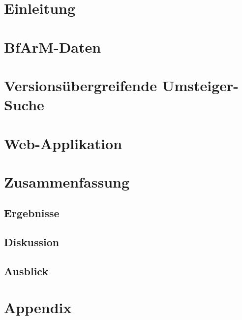 \documentclass[german,version-2020-11]{uzl-thesis}
\begin{document}
%

\chapter{Einleitung} 

\chapter{BfArM-Daten} 

\chapter{Versionsübergreifende Umsteiger-Suche} 

\chapter{Web-Applikation}

\chapter{Zusammenfassung}
\section{Ergebnisse}
\section{Diskussion}
\section{Ausblick}

\appendix
\chapter{Appendix}

%
\newpage

\newpage

\end{document}
